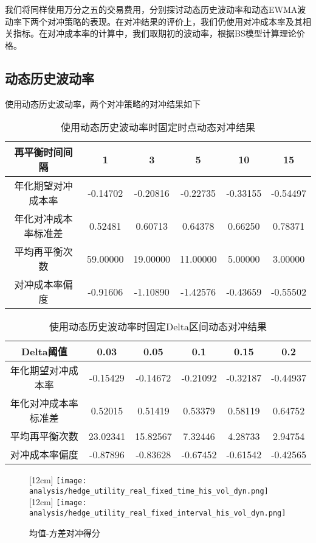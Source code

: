 我们将同样使用万分之五的交易费用，分别探讨动态历史波动率和动态EWMA波动率下两个对冲策略的表现。在对冲结果的评价上，我们仍使用对冲成本率及其相关指标。在对冲成本率的计算中，我们取期初的波动率，根据BS模型计算理论价格。

\subsection{动态历史波动率}

使用动态历史波动率，两个对冲策略的对冲结果如下

\begin{table}[htbp]
  \centering
  \caption{使用动态历史波动率时固定时点动态对冲结果}
  \label{tab:fixed_time_5_his_vol_dyn}
  \begin{tabular}{cccccc}
    \toprule
    再平衡时间间隔 & 1 & 3 & 5 & 10 & 15 \\
    \midrule
    年化期望对冲成本率 & -0.14702 & -0.20816 & -0.22735 & -0.33155 & -0.54497 \\
    年化对冲成本率标准差 & 0.52481 & 0.60713 & 0.64378 & 0.66250 & 0.78371 \\
    平均再平衡次数 & 59.00000 & 19.00000 & 11.00000 & 5.00000 & 3.00000 \\
    对冲成本率偏度 & -0.91606 & -1.10890 & -1.42576 & -0.43659 & -0.55502 \\
    \bottomrule
  \end{tabular}
\end{table}

\begin{table}[htbp]
  \centering
  \caption{使用动态历史波动率时固定Delta区间动态对冲结果}
  \label{tab:fixed_interval_5_his_vol_dyn}
  \begin{tabular}{cccccc}
    \toprule
    Delta阈值 & 0.03 & 0.05 & 0.1 & 0.15 & 0.2 \\
    \midrule
    年化期望对冲成本率 & -0.15429 & -0.14672 & -0.21092 & -0.32187 & -0.44937 \\
    年化对冲成本率标准差 & 0.52015 & 0.51419 & 0.53379 & 0.58119 & 0.64752 \\
    平均再平衡次数 & 23.02341 & 15.82567 & 7.32446 & 4.28733 & 2.94754 \\
    对冲成本率偏度 & -0.87896 & -0.83628 & -0.67452 & -0.61542 & -0.42565 \\
    \bottomrule
  \end{tabular}
\end{table}

\begin{figure}[htb]
  \centering
  [12cm]
    {\texttt{[image: analysis/hedge\_utility\_real\_fixed\_time\_his\_vol\_dyn.png]}}
  \hspace{0.5cm}
  [12cm]
    {\texttt{[image: analysis/hedge\_utility\_real\_fixed\_interval\_his\_vol\_dyn.png]}}
    \caption[这里将出现在插图索引中]
    {均值-方差对冲得分}
  \label{fig:hedge_utility_real_his_dyn}
\end{figure}

